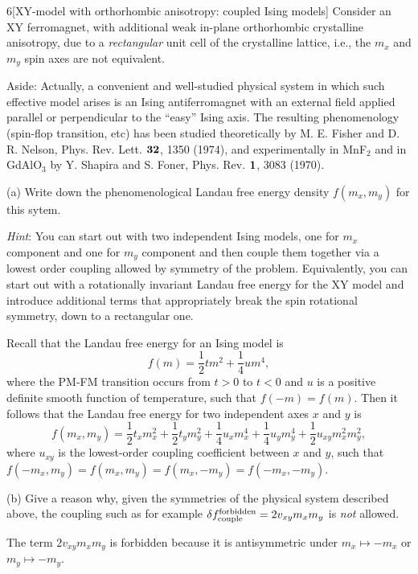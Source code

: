 \documentclass[12pt]{article}
\begin{document}
\begin{problem}{6}[XY-model with orthorhombic anisotropy: coupled Ising models]
Consider an XY ferromagnet, with additional weak in-plane orthorhombic
crystalline anisotropy, due to a \textit{rectangular} unit cell of the
crystalline lattice, i.e., the $m_x$ and $m_y$ spin axes are not equivalent.

Aside: Actually, a convenient and well-studied physical system in which such
effective model arises is an Ising antiferromagnet with an external field
applied parallel or perpendicular to the ``easy'' Ising axis. The resulting
phenomenology (spin-flop transition, etc) has been studied theoretically by M.
E. Fisher and D. R. Nelson, Phys. Rev. Lett. $\vb{32}$, 1350 (1974), and
experimentally in MnF$_2$ and in GdAlO$_3$ by Y. Shapira and S. Foner, Phys.
Rev. $\vb{1}$, 3083 (1970).

(a) Write down the phenomenological Landau free energy density $f(m_x,m_y)$ for
this sytem.

\textit{Hint}: You can start out with two independent Ising models, one for
$m_x$ component and one for $m_y$ component and then couple them together via a
lowest order coupling allowed by symmetry of the problem. Equivalently, you can
start out with a rotationally invariant Landau free energy for the XY model and
introduce additional terms that appropriately break the spin rotational
symmetry, down to a rectangular one.

\begin{solution}
Recall that the Landau free energy for an Ising model is
\begin{equation}
    f(m)=\frac12tm^2+\frac14um^4, 
\end{equation}
where the PM-FM transition occurs from $t>0$ to $t<0$ and $u$ is a positive
definite smooth function of temperature, such that $f(-m)=f(m)$. Then it 
follows that the Landau free energy for two independent axes $x$ and $y$ is
\begin{equation}
    f(m_x,m_y)
    =\frac12t_xm_x^2+\frac12t_ym_y^2+\frac14u_xm_x^4+\frac14u_ym_y^4
    +\frac12u_{xy}m_x^2m_y^2,
\end{equation}
where $u_{xy}$ is the lowest-order coupling coefficient between $x$ and $y$,
such that $f(-m_x,m_y)=f(m_x,m_y)=f(m_x,-m_y)=f(-m_x,-m_y)$.
\end{solution}

(b) Give a reason why, given the symmetries of the physical system described
above, the coupling such as for example $\delta
f_{\text{couple}}^{\text{forbidden}}=2v_{xy}m_xm_y$ is \textit{not} allowed.
\begin{solution}
The term $2v_{xy}m_xm_y$ is forbidden because it is antisymmetric under
$m_x\mapsto-m_x$ or $m_y\mapsto-m_y$. 
\end{solution}


\end{problem}
\end{document}

